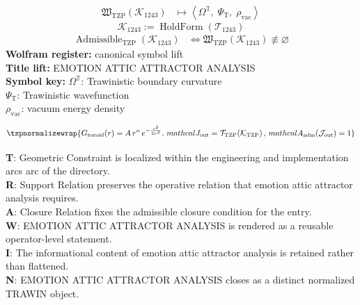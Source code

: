 \noindent
\begin{minipage}[t]{0.48\linewidth}
\begingroup
\small
\[
\begin{aligned}
\mathfrak{W}_{\mathrm{TZP}}\!\left(\mathcal{K}_{1243}\right)
&\longmapsto
\left\langle \Omega^{\mathbb{T}},\; \Psi_{\mathrm{T}},\; \rho_{\mathrm{vac}} \right\rangle
\end{aligned}
\]
\[
\mathcal{K}_{1243}
:=
\operatorname{HoldForm}\!\left(\mathcal{T}_{1243}\right)
\]
\[
\begin{aligned}
\operatorname{Admissible}_{\mathrm{TZP}}\!\left(\mathcal{K}_{1243}\right)
&\Longleftrightarrow
\mathfrak{W}_{\mathrm{TZP}}\!\left(\mathcal{K}_{1243}\right)\not\equiv\varnothing
\end{aligned}
\]
\textbf{Wolfram register:} canonical symbol lift\\
\textbf{Title lift:} EMOTION ATTIC ATTRACTOR ANALYSIS\\
\textbf{Symbol key:} \(\Omega^{\mathbb{T}}\): Trawinistic boundary curvature\\ \(\Psi_{\mathrm{T}}\): Trawinistic wavefunction\\ \(\rho_{\mathrm{vac}}\): vacuum energy density
\par
\endgroup
\end{minipage}\hfill
\begin{minipage}[t]{0.48\linewidth}
\[
\tzpnormalizewrap{G_\text{toroid}(r) = A \, r^n \, e^{-\frac{r^2}{2\sigma^2}},\,mathcal{J}_{\mathrm{out}} = \mathcal{T}_{\mathrm{TZP}}\!\left(\mathcal{K}_{\mathrm{TZP}}\right),\,mathcal{A}_{\mathrm{adm}}\!\left(\mathcal{J}_{\mathrm{out}}\right)=1}
\]

\small
\textbf{T}: Geometric Constraint is localized within the engineering and implementation arcs arc of the directory.\\
\textbf{R}: Support Relation preserves the operative relation that emotion attic attractor analysis requires.\\
\textbf{A}: Closure Relation fixes the admissible closure condition for the entry.\\
\textbf{W}: EMOTION ATTIC ATTRACTOR ANALYSIS is rendered as a reusable operator-level statement.\\
\textbf{I}: The informational content of emotion attic attractor analysis is retained rather than flattened.\\
\textbf{N}: EMOTION ATTIC ATTRACTOR ANALYSIS closes as a distinct normalized TRAWIN object.
\normalsize
\end{minipage}

